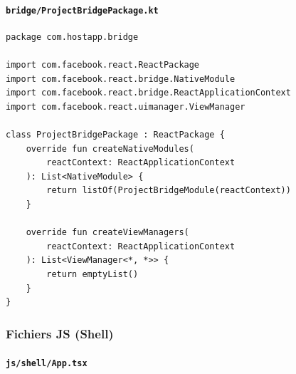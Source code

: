 \documentclass[11pt]{article}
\begin{document}
\paragraph{\texttt{bridge/ProjectBridgePackage.kt}}

\begin{verbatim}
package com.hostapp.bridge

import com.facebook.react.ReactPackage
import com.facebook.react.bridge.NativeModule
import com.facebook.react.bridge.ReactApplicationContext
import com.facebook.react.uimanager.ViewManager

class ProjectBridgePackage : ReactPackage {
    override fun createNativeModules(
        reactContext: ReactApplicationContext
    ): List<NativeModule> {
        return listOf(ProjectBridgeModule(reactContext))
    }

    override fun createViewManagers(
        reactContext: ReactApplicationContext
    ): List<ViewManager<*, *>> {
        return emptyList()
    }
}
\end{verbatim}

\subsubsection*{Fichiers JS (Shell)}

\paragraph{\texttt{js/shell/App.tsx}}
\end{document}
